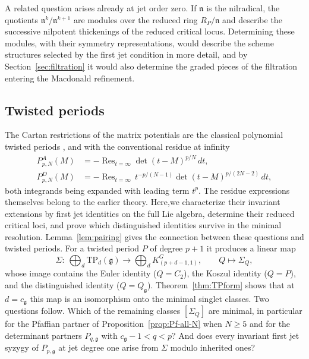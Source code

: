 \documentclass[10pt,reqno]{amsart}
\numberwithin{equation}{section}
\theoremstyle{plain}
\theoremstyle{definition}
\DeclareMathOperator{\Res}{Res}
\newcommand{\TP}{\mathrm{TP}}
\begin{document}
A related question arises already at jet order zero. If $\mathfrak{n}$ is the nilradical, the quotients $\mathfrak{n}^k/\mathfrak{n}^{k+1}$ are modules over the reduced ring $R_P/\mathfrak{n}$ and describe the successive nilpotent thickenings of the reduced critical locus. Determining these modules, with their symmetry representations, would describe the scheme structures selected by the first jet condition in more detail, and by Section~\ref{sec:filtration} it would also determine the graded pieces of the filtration entering the Macdonald refinement.

\subsection{Twisted periods}

The Cartan restrictions of the matrix potentials are the classical polynomial twisted periods \cite{DubrovinAlmost,EYY,FS}, and with the conventional residue at infinity
\begin{align*}
	P^A_{p,N}(M)&=-\Res_{t=\infty}\det(t-M)^{p/N}\,dt,\\
	P^D_{p,N}(M)&=-\Res_{t=\infty}\,t^{-p/(N-1)}\det(t-M)^{p/(2N-2)}\,dt,
\end{align*}
both integrands being expanded with leading term $t^p$. The residue expressions themselves belong to the earlier theory. Here,we characterize their invariant extensions by first jet identities on the full Lie algebra, determine their reduced critical loci, and prove which distinguished identities survive in the minimal resolution. Lemma~\ref{lem:pairing} gives the connection between these questions and twisted periods. For a twisted period $P$ of degree $p+1$ it produces a linear map
\begin{equation*}
	\Sigma:\ \bigoplus_d\TP_d(\mathfrak{g})\longrightarrow\bigoplus_dK^G_{(p+d-1,1)},\qquad Q\longmapsto\Sigma_Q ,
\end{equation*}
whose image contains the Euler identity ($Q=C_2$), the Koszul identity ($Q=P$), and the distinguished identity ($Q=Q_\mathfrak{g}$). Theorem~\ref{thm:TPform} shows that at $d=c_\mathfrak{g}$ this map is an isomorphism onto the minimal singlet classes. Two questions follow. Which of the remaining classes $[\Sigma_Q]$ are minimal, in particular for the Pfaffian partner of Proposition~\ref{prop:Pf-all-N} when $N\ge5$ and for the determinant partners $P_{q,\mathfrak{g}}$ with $c_\mathfrak{g}-1<q<p$? And does every invariant first jet syzygy of $P_{p,\mathfrak{g}}$ at jet degree one arise from $\Sigma$ modulo inherited ones?
\end{document}
